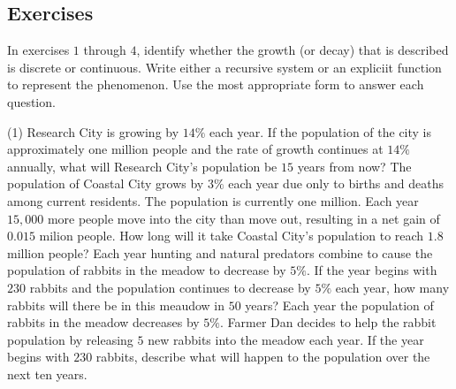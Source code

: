 \documentclass[10pt,]{book}
\theoremstyle{plain}
\theoremstyle{definition}
\theoremstyle{definition}
\theoremstyle{definition}
\numberwithin{equation}{section}
\begin{document}
\subsection[{Exercises}]{Exercises}\label{exercises-5}
\hypertarget{exercisegroup-1}{}\par\noindent \hypertarget{p-124}{}%
In exercises \(1\) through \(4\), identify whether the growth (or decay) that is described is discrete or continuous.  Write either a recursive system or an expliciit function to represent the phenomenon. Use the most appropriate form to answer each question.%
\begin{exercisegroup}(1)
\exercise[1.]\hypertarget{exercise-20}{}\hypertarget{p-125}{}%
Research City is growing by \(14\%\) each year.  If the population of the city is approximately one million people and the rate of growth continues at \(14\%\) annually, what will Research City's population be \(15\) years from now?%
\exercise[2.]\hypertarget{exercise-21}{}\hypertarget{p-126}{}%
The population of Coastal City grows by \(3\%\) each year due only to births and deaths among current residents.  The population is currently one million.  Each year \(15,000\) more people move into the city than move out, resulting in a net gain of \(0.015\) milion people. How long will it take Coastal City's population to reach \(1.8\) million people?%
\exercise[3.]\hypertarget{exercise-22}{}\hypertarget{p-127}{}%
Each year hunting and natural predators combine to cause the population of rabbits in the meadow to decrease by \(5\%\).  If the year begins with \(230\) rabbits and the population continues to decrease by \(5\%\) each year, how many rabbits will there be in this meaudow in \(50\) years?%
\exercise[4.]\hypertarget{exercise-23}{}\hypertarget{p-128}{}%
Each year the population of rabbits in the meadow decreases by \(5\%\).  Farmer Dan decides to help the rabbit population by releasing \(5\) new rabbits into the meadow each year.  If the year begins with \(230\) rabbits, describe what will happen to the population over the next ten years.%
\end{exercisegroup}
\par\smallskip\noindent
\end{document}
